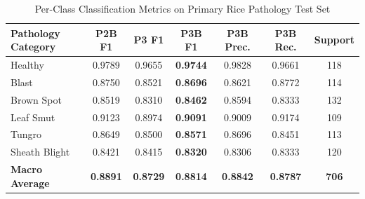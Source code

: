 \begin{table}[htbp]
\centering
\caption{Per-Class Classification Metrics on Primary Rice Pathology Test Set}
\label{tab:per_class}
\begin{tabular}{lcccccc}
\hline
\textbf{Pathology Category} & \textbf{P2B F1} & \textbf{P3 F1} & \textbf{P3B F1} & \textbf{P3B Prec.} & \textbf{P3B Rec.} & \textbf{Support} \\
\hline
Healthy & 0.9789 & 0.9655 & \textbf{0.9744} & 0.9828 & 0.9661 & 118 \\
Blast & 0.8750 & 0.8521 & \textbf{0.8696} & 0.8621 & 0.8772 & 114 \\
Brown Spot & 0.8519 & 0.8310 & \textbf{0.8462} & 0.8594 & 0.8333 & 132 \\
Leaf Smut & 0.9123 & 0.8974 & \textbf{0.9091} & 0.9009 & 0.9174 & 109 \\
Tungro & 0.8649 & 0.8500 & \textbf{0.8571} & 0.8696 & 0.8451 & 113 \\
Sheath Blight & 0.8421 & 0.8415 & \textbf{0.8320} & 0.8306 & 0.8333 & 120 \\
\hline
\textbf{Macro Average} & \textbf{0.8891} & \textbf{0.8729} & \textbf{0.8814} & \textbf{0.8842} & \textbf{0.8787} & \textbf{706} \\
\hline
\end{tabular}
\end{table}

